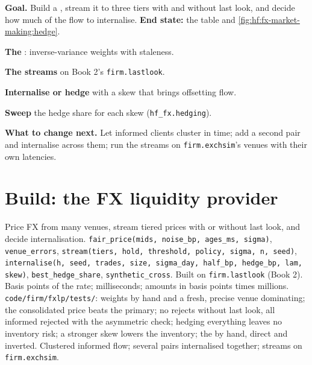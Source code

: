 \begin{tutorial}
\textbf{Goal.} Build a , stream it to three tiers with and without last look, and decide how much of the flow to internalise.
\textbf{End state:} the table and \cref{fig:hf:fx-market-making:hedge}.
\begin{tutsteps}
\item \textbf{The }: inverse-variance weights with staleness.
\label{lst:hf:fx-market-making:fair}
\item \textbf{The streams} on Book 2's \texttt{firm.lastlook}.
\label{lst:hf:fx-market-making:stream}
\item \textbf{Internalise or hedge} with a skew that brings offsetting flow.
\label{lst:hf:fx-market-making:internalise}
\item \textbf{Sweep} the hedge share for each skew (\texttt{hf\_fx.hedging}).
\end{tutsteps}
\textbf{What to change next.} Let informed clients cluster in time; add a second pair and internalise across them; run the streams on
\texttt{firm.exchsim}'s venues with their own latencies.
\end{tutorial}

\section{Build: the FX liquidity provider}\label{bld:hf:fx-market-making:fxlp}

\begin{build}
 Price FX from many venues, stream tiered prices with or without last look, and decide internalisation.
 \texttt{fair\_price(mids, noise\_bp, ages\_ms, sigma)}, \texttt{venue\_errors}, \texttt{stream(tiers, hold, threshold, policy,
sigma, n, seed)}, \texttt{internalise(h, seed, trades, size, sigma\_day, half\_bp, hedge\_bp, lam, skew)}, \texttt{best\_hedge\_share},
\texttt{synthetic\_cross}. Built on \texttt{firm.lastlook} (Book 2).
 Basis points of the rate; milliseconds; amounts in basis points times millions.
 \texttt{code/firm/fxlp/tests/}: weights by hand and a fresh, precise venue dominating; the consolidated price beats the
primary; no rejects without last look, all informed rejected with the asymmetric check; hedging everything leaves no inventory risk; a stronger skew
lowers the inventory; the  by hand, direct and inverted.
 Clustered informed flow; several pairs internalised together; streams on \texttt{firm.exchsim}.
\end{build}

